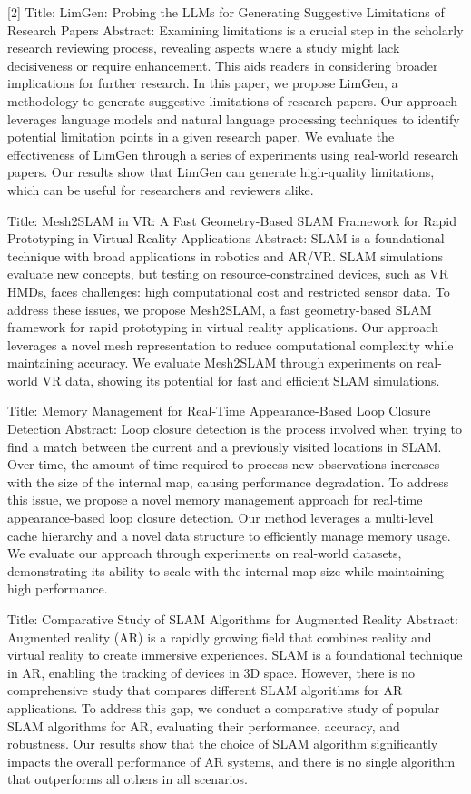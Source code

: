 \documentclass[conference]{IEEEtran}
\begin{document}
[2] Title: LimGen: Probing the LLMs for Generating Suggestive Limitations of
  Research Papers
Abstract:   Examining limitations is a crucial step in the scholarly research reviewing
process, revealing aspects where a study might lack decisiveness or require
enhancement. This aids readers in considering broader implications for further
research. In this paper, we propose LimGen, a methodology to generate
suggestive limitations of research papers. Our approach leverages language
models and natural language processing techniques to identify potential
limitation points in a given research paper. We evaluate the effectiveness of
LimGen through a series of experiments using real-world research papers.
Our results show that LimGen can generate high-quality limitations, which can be
useful for researchers and reviewers alike.

\cite{unknown00003} Title: Mesh2SLAM in VR: A Fast Geometry-Based SLAM Framework for Rapid
  Prototyping in Virtual Reality Applications
Abstract:   SLAM is a foundational technique with broad applications in robotics and
AR/VR. SLAM simulations evaluate new concepts, but testing on
resource-constrained devices, such as VR HMDs, faces challenges: high
computational cost and restricted sensor data. To address these issues, we
propose Mesh2SLAM, a fast geometry-based SLAM framework for rapid
prototyping in virtual reality applications. Our approach leverages a novel
mesh representation to reduce computational complexity while maintaining
accuracy. We evaluate Mesh2SLAM through experiments on real-world VR data,
showing its potential for fast and efficient SLAM simulations.

\cite{unknown00004} Title: Memory Management for Real-Time Appearance-Based Loop Closure Detection
Abstract:   Loop closure detection is the process involved when trying to find a match
between the current and a previously visited locations in SLAM. Over time, the
amount of time required to process new observations increases with the size of
the internal map, causing performance degradation. To address this issue, we
propose a novel memory management approach for real-time appearance-based loop
closure detection. Our method leverages a multi-level cache hierarchy and a
novel data structure to efficiently manage memory usage. We evaluate our
approach through experiments on real-world datasets, demonstrating its
ability to scale with the internal map size while maintaining high performance.

\cite{unknown00005} Title: Comparative Study of SLAM Algorithms for Augmented Reality
Abstract:   Augmented reality (AR) is a rapidly growing field that combines
reality and virtual reality to create immersive experiences. SLAM is a
foundational technique in AR, enabling the tracking of devices in 3D
space. However, there is no comprehensive study that compares different
SLAM algorithms for AR applications. To address this gap, we conduct a
comparative study of popular SLAM algorithms for AR, evaluating their
performance, accuracy, and robustness. Our results show that the choice of
SLAM algorithm significantly impacts the overall performance of AR
systems, and there is no single algorithm that outperforms all others in
all scenarios.
\end{document}

